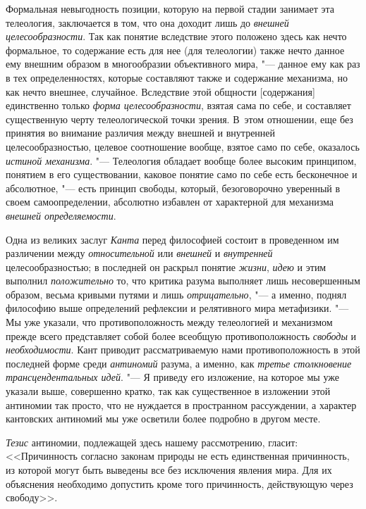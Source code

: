 Формальная невыгодность позиции, которую на первой стадии
занимает эта телеология, заключается в том, что она доходит лишь до
{\em внешней целесообразности}.
Так как понятие вследствие этого положено здесь как нечто
формальное, то содержание есть для нее (для телеологии) также нечто данное
ему внешним образом в многообразии объективного мира, "---
данное ему как раз в тех определенностях, которые составляют
также и содержание механизма, но как нечто внешнее, случайное. Вследствие
этой общности [содержания] единственно только
{\em форма целесообразности},
взятая сама по себе, и составляет существенную черту
телеологической точки зрения. В~этом отношении, еще без принятия во
внимание различия между внешней и внутренней целесообразностью, целевое
соотношение вообще, взятое само по себе, оказалось
{\em истиной механизма}. "---
Телеология обладает вообще более высоким принципом, понятием
в его существовании, каковое понятие само по себе есть бесконечное и
абсолютное, "--- есть принцип свободы, который, безоговорочно
уверенный в своем самоопределении, абсолютно избавлен от характерной для
механизма {\em внешней определяемости}.

Одна из великих заслуг
{\em Канта} перед
философией состоит в проведенном им различении между
{\em относительной} или
{\em внешней} и
{\em внутренней}
целесообразностью; в последней он раскрыл понятие
{\em жизни},
{\em идею} и этим выполнил
{\em положительно} то,
что критика разума выполняет лишь несовершенным образом, весьма кривыми
путями и лишь {\em отрицательно}, "---
а именно, поднял философию выше определений рефлексии и
релятивного мира метафизики. "--- Мы уже указали, что
противоположность между телеологией и механизмом прежде всего представляет
собой более всеобщую противоположность
{\em свободы} и
{\em необходимости}. Кант
приводит рассматриваемую нами противоположность в этой последней форме
среди {\em антиномий}
разума, а именно, как
{\em третье столкновение
трансцендентальных идей}. "--- Я приведу его изложение, на
которое мы уже указали выше, совершенно кратко, так как существенное в
изложении этой антиномии так просто, что не нуждается в пространном
рассуждении, а характер кантовских антиномий мы уже осветили
более подробно в другом месте.

{\em Тезис} антиномии,
подлежащей здесь нашему рассмотрению, гласит: <<Причинность согласно законам
природы не есть единственная причинность, из которой могут быть выведены
все без исключения явления мира. Для их объяснения необходимо допустить
кроме того причинность, действующую через свободу>>.

